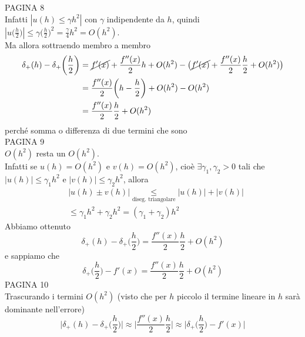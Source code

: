 \documentclass[12pt,a4paper]{article}
\begin{document}
PAGINA 8 \\%
Infatti $|u(h) \leq \gamma h^2|$ con $\gamma$ indipendente da $h$, quindi $|u\bigl(\frac{h}{2}\bigr)| \leq \gamma \bigl(\frac{h}{2}\bigr)^2 = \frac{\gamma}{4}h^2=O(h^2)$.\\
Ma allora sottraendo membro a membro
\begin{equation*}
    \begin{split}
        \delta_+(h)-\delta_+ \biggl(\frac{h}{2}\biggr) & = \cancel{f'(x)}+\frac{f''(x)}{2}h + O(h^2) - \bigl( \cancel{f'(x)} + \frac{f''(x)}{2}\frac{h}{2} + O(h^2) \bigr) \\
        & = \frac{f''(x)}{2}\biggl(h-\frac{h}{2}\biggr) + O(h^2) - O(h^2) \\
        & = \frac{f''(x)}{2}\frac{h}{2}+O(h^2)
    \end{split}
\end{equation*}
perché somma o differenza di due termini che sono\\
PAGINA 9 \\%
$O(h^2)$ resta un $O(h^2)$.\\
Infatti se $u(h)=O(h^2)$ e $v(h)=O(h^2)$, cioè $\exists \gamma_1, \gamma_2 > 0$ tali che $|u(h)|\leq \gamma_1 h^2$ e $|v(h)|\leq \gamma_2 h^2$, allora
\begin{equation*}
    \begin{split}
        & |u(h) \pm v(h)| \underset{\text{diseg. triangolare}}{\leq} |u(h)|+|v(h)| \\
        & \leq \gamma_1 h^2 + \gamma_2 h^2 = (\gamma_1 + \gamma_2) h^2
    \end{split}    
\end{equation*}
Abbiamo ottenuto
\begin{equation*}
    \delta_+(h) - \delta_+\biggl(\frac{h}{2}\biggr) = \frac{f''(x)}{2}\frac{h}{2} + O(h^2)
\end{equation*}
e sappiamo che 
\begin{equation*}
    \delta_+\biggl(\frac{h}{2}\biggr) - f'(x) = \frac{f''(x)}{2}\frac{h}{2} + O(h^2)
\end{equation*}
PAGINA 10 \\%
Trascurando i termini $O(h^2)$ (visto che per $h$ piccolo il termine lineare in $h$ sarà dominante nell'errore)
\begin{equation*}
    \biggl|\delta_+(h) - \delta_+\biggl(\frac{h}{2}\biggr)\biggr| \approx \biggl|\frac{f''(x)}{2}\frac{h}{2}\biggr| \approx \biggl|\delta_+\biggl(\frac{h}{2}\biggr) - f'(x) \biggr|
\end{equation*}
\end{document}
